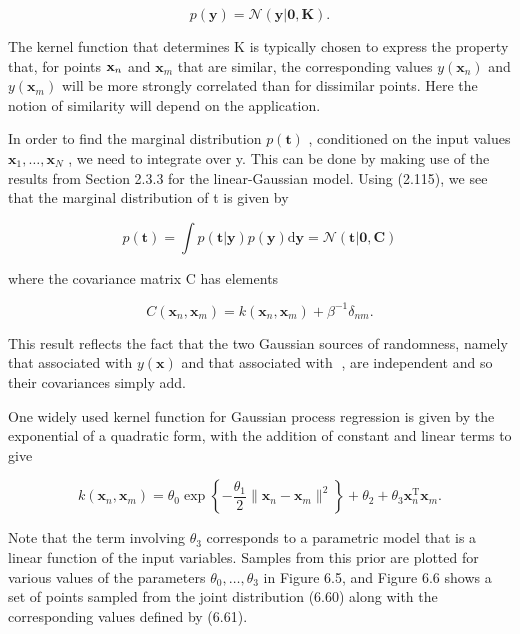 \documentclass[
  10
]{article}
\begin{document}
\[
p (\mathbf {y}) = \mathcal {N} (\mathbf {y} | \mathbf {0}, \mathbf {K}).\tag{6.60}
\]

The kernel function that determines K is typically chosen to express the
property that, for points \({ \bf x } _ { n }\) and
\(\mathbf { x } _ { m }\) that are similar, the corresponding values
\(y ( \mathbf { x } _ { n } )\) and \(y ( \mathbf { x } _ { m } )\) will
be more strongly correlated than for dissimilar points. Here the notion
of similarity will depend on the application.

In order to find the marginal distribution \(p ( \mathbf { t } )\) ,
conditioned on the input values
\(\mathbf { x } _ { 1 } , \ldots , \mathbf { x } _ { N }\) , we need to
integrate over y. This can be done by making use of the results from
Section 2.3.3 for the linear-Gaussian model. Using (2.115), we see that
the marginal distribution of t is given by

\[
p (\mathbf {t}) = \int p (\mathbf {t} | \mathbf {y}) p (\mathbf {y}) \mathrm{d} \mathbf {y} = \mathcal {N} (\mathbf {t} | \mathbf {0}, \mathbf {C})\tag{6.61}
\]

where the covariance matrix C has elements

\[
C (\mathbf {x} _ {n}, \mathbf {x} _ {m}) = k (\mathbf {x} _ {n}, \mathbf {x} _ {m}) + \beta^ {- 1} \delta_ {n m}.\tag{6.62}
\]

This result reflects the fact that the two Gaussian sources of
randomness, namely that associated with \(y ( \mathbf x )\) and that
associated with , are independent and so their covariances simply add.

One widely used kernel function for Gaussian process regression is given
by the exponential of a quadratic form, with the addition of constant
and linear terms to give

\[
k (\mathbf {x} _ {n}, \mathbf {x} _ {m}) = \theta_ {0} \exp \left\{- \frac {\theta_ {1}}{2} \| \mathbf {x} _ {n} - \mathbf {x} _ {m} \| ^ {2} \right\} + \theta_ {2} + \theta_ {3} \mathbf {x} _ {n} ^ {\mathrm{T}} \mathbf {x} _ {m}.\tag{6.63}
\]

Note that the term involving \(\theta _ { 3 }\) corresponds to a
parametric model that is a linear function of the input variables.
Samples from this prior are plotted for various values of the parameters
\(\theta _ { 0 } , \ldots , \theta _ { 3 }\) in Figure 6.5, and Figure
6.6 shows a set of points sampled from the joint distribution (6.60)
along with the corresponding values defined by (6.61).
\end{document}
